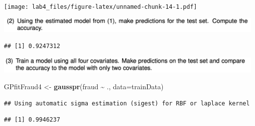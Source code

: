 \documentclass[
]{article}
\newenvironment{Shaded}{\begin{snugshade}}{\end{snugshade}}
\newcommand{\AttributeTok}[1]{\textcolor[rgb]{0.13,0.29,0.53}{#1}}
\newcommand{\DecValTok}[1]{\textcolor[rgb]{0.00,0.00,0.81}{#1}}
\newcommand{\FunctionTok}[1]{\textcolor[rgb]{0.13,0.29,0.53}{\textbf{#1}}}
\newcommand{\NormalTok}[1]{#1}
\newcommand{\OtherTok}[1]{\textcolor[rgb]{0.56,0.35,0.01}{#1}}
\newcommand{\SpecialCharTok}[1]{\textcolor[rgb]{0.81,0.36,0.00}{\textbf{#1}}}
\begin{document}
\texttt{[image: lab4\_files/figure-latex/unnamed-chunk-14-1.pdf]}

\hfill\break

\includegraphics{images/Screenshot 2024-10-13 at 20.11.27.png}

\begin{Shaded}
\end{Shaded}

\begin{verbatim}
## [1] 0.9247312
\end{verbatim}

\includegraphics{images/Screenshot 2024-10-13 at 20.11.36.png}\\

\begin{Shaded}
\begin{Highlighting}[]
\NormalTok{GPfitFraud4 }\OtherTok{\textless{}{-}} \FunctionTok{gausspr}\NormalTok{(fraud }\SpecialCharTok{\textasciitilde{}}\NormalTok{ ., }\AttributeTok{data=}\NormalTok{trainData)}
\end{Highlighting}
\end{Shaded}

\begin{verbatim}
## Using automatic sigma estimation (sigest) for RBF or laplace kernel
\end{verbatim}

\begin{Shaded}
\end{Shaded}

\begin{verbatim}
## [1] 0.9946237
\end{verbatim}
\end{document}
